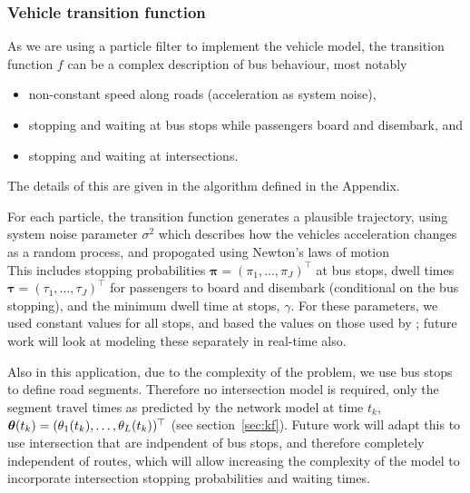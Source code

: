 \subsubsection{Vehicle transition function}
\label{sec:pf_prediction}
As we are using a particle filter to implement the vehicle model,
the transition function $f$ can be a complex description of bus behaviour,
most notably
\begin{itemize}
\item non-constant speed along roads (acceleration as system noise),
\item stopping and waiting at bus stops while passengers board and disembark, and
\item stopping and waiting at intersections.
\end{itemize}
The details of this are given in the algorithm defined in the Appendix.

For each particle, the transition function generates a plausible trajectory,
using system noise parameter $\sigma^2$ which describes 
how the vehicles acceleration changes as a random process,
and propogated using Newton's laws of motion \cite{}
\begin{equation}

\end{equation}
This includes stopping probabilities $\boldsymbol\pi = (\pi_1,\ldots,\pi_J)^\top$ at bus stops,
dwell times $\boldsymbol\tau = (\tau_1,\ldots,\tau_J)^\top$ for passengers to
board and disembark (conditional on the bus stopping),
and the minimum dwell time at stops, $\gamma$.
For these parameters, we used constant values for all stops,
and based the values on those used by \cite{Hans_2015};
future work will look at modeling these separately in real-time also.

Also in this application, due to the complexity of the problem,
we use bus stops to define road segments.
Therefore no intersection model is required,
only the segment travel times as predicted by the network model at time $t_k$,
$\boldsymbol{\theta}(t_k) = (\theta_1(t_k), \ldots, \theta_L(t_k))^\top$
(see section~\ref{sec:kf}).
Future work will adapt this to use intersection that are indpendent 
of bus stops, and therefore completely independent of routes,
which will allow increasing the complexity of the model to incorporate
intersection stopping probabilities and waiting times.


